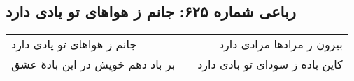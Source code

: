 \begin{center}
\section*{رباعی شماره ۶۲۵: جانم ز هواهای تو یادی دارد}
\label{sec:0625}
\begin{longtable}{l p{0.5cm} r}
جانم ز هواهای تو یادی دارد
&&
بیرون ز مرادها مرادی دارد
\\
بر باد دهم خویش در این بادهٔ عشق
&&
کاین باده ز سودای تو بادی دارد
\\
\end{longtable}
\end{center}
